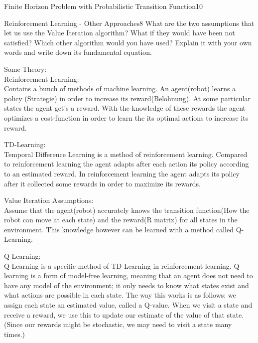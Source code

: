 \begin{questions}
\begin{question}{Finite Horizon Problem with Probabilistic Transition Function}{10}
\begin{answer}
	
	
\end{answer}


\end{question}



\begin{question}[bonus]{Reinforcement Learning - Other Approaches}{8}
What are the two assumptions that let us use the Value Iteration algorithm? What if they would have been not satisfied? Which other algorithm would you have used? Explain it with your own words and write down its fundamental equation.

\begin{answer}
Some Theory:\\
Reinforcement Learning:\\
Contains a bunch of methods of machine learning. An agent(robot) learns a policy (Strategie) in order to increase its reward(Belohnung). At some particular states the agent get's a reward. With the knowledge of these rewards the agent optimizes a cost-function in order to learn the its optimal actions to increase its reward.

TD-Learning:\\
Temporal Difference Learning is a method of reinforcement learning. Compared to reinforcement learning the agent adapts after each action its policy according to an estimated reward. In reinforcement learning the agent adapts its policy after it collected some rewards in order to maximize its rewards. 


Value Iteration Assumptions:\\
Assume that the agent(robot) accurately knows the transition function(How the robot can move at each state) and the reward(R matrix) for all states in the environment. This knowledge however can be learned with a method called Q-Learning.

Q-Learning:\\
Q-Learning is a specific method of TD-Learning in reinforcement learning. 
Q-learning is a form of model-free learning, meaning that an agent does not need to have any model of the environment; it only needs to know what states exist and what actions are possible in each state.
The way this works is as follows: we assign each state an estimated value, called a Q-value. When we visit a state and receive a reward, we use this to update our estimate of the value of that state. (Since our rewards might be stochastic, we may need to visit a state many times.)


\end{answer}
\end{question}
\end{questions}
